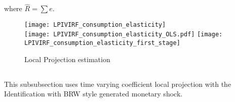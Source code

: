 \documentclass[12pt]{article}
\begin{document}
where $\hat{R}=\sum e$.


\citet{}

\begin{figure}[!htbp]\centering
    \begin{minipage}{\textwidth}
        \caption{Local Projection estimation}
        \vspace{1ex}
        \texttt{[image: LPIVIRF\_consumption\_elasticity]}\\
        \texttt{[image: LPIVIRF\_consumption\_elasticity\_OLS.pdf]}
        \texttt{[image: LPIVIRF\_consumption\_elasticity\_first\_stage]}
\begin{flushleft}\scriptsize 
\end{flushleft}
    \end{minipage}
\end{figure}



\subsection{}

This subsubsection uses time varying coefficient local projection with the Identification with BRW style generated monetary shock.
\end{document}
